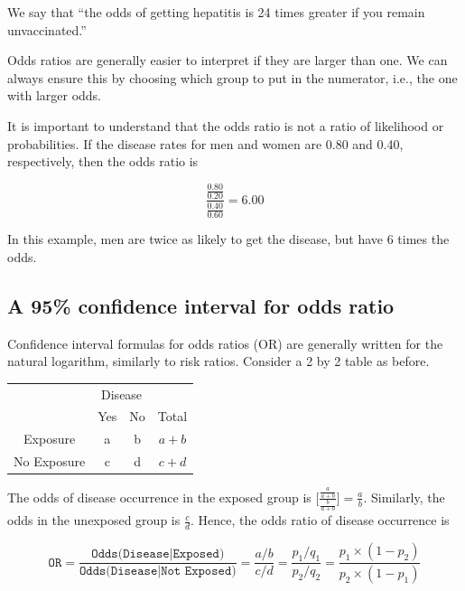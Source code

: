 \documentclass[11pt, chapterprefix=true]{scrbook}\usepackage[]{graphicx}\usepackage[]{color}
\begin{document}
We say that ``the odds of getting hepatitis is 24 times greater if you remain unvaccinated.''

Odds ratios are generally easier to interpret if they are larger than one.  We can always ensure this by choosing which group to put in the numerator, i.e., the one with larger odds.

It is important to understand that the odds ratio is not a ratio of likelihood or probabilities.  If the disease rates for men and women are 0.80 and 0.40, respectively, then the odds ratio is

\begin{equation*}
   \frac{ \frac{0.80}{0.20}}{ \frac{0.40}{0.60}} = 6.00
\end{equation*}

In this example, men are twice as likely to get the disease, but have 6 times the odds.

\subsection{A 95\% confidence interval for odds ratio}

Confidence interval formulas for odds ratios (OR) are generally written for the natural logarithm, similarly to risk ratios.  Consider a 2 by 2 table as before.

\begin{table}[ht]
\centering
\begin{tabular}{@{} cccc @{}} \hline
 & \multicolumn{2}{c}{Disease} \\
 & Yes & No & Total \\ \hline
 Exposure & a & b & $a + b$ \\
 No Exposure  & c & d & $c + d$ \\ \hline
 \end{tabular}
 \end{table}

The odds of disease occurrence in the exposed group is $\Big[ \frac{ \frac{a}{a + b}}{ \frac{b}{a + b}} \Big] = \frac{a}{b} $.  Similarly, the odds in the unexposed group is $\frac{c}{d}$.  Hence, the odds ratio of disease occurrence is

\begin{equation*}
  \texttt{OR} = \frac{\texttt{Odds(Disease|Exposed)}}{\texttt{Odds(Disease|Not Exposed)}} = \frac{a/b}{c/d} = \frac{p_1 / q_1}{p_2 / q_2} = \frac{ p_1 \times (1- p_2)}{ p_2 \times (1 - p_1)}
\end{equation*}
\end{document}
